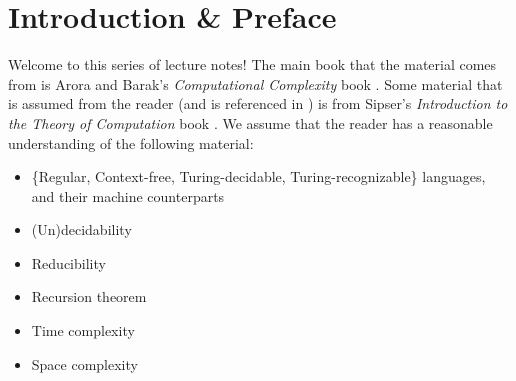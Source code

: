 \section{Introduction \& Preface}

Welcome to this series of lecture notes! The main book that the material comes from is Arora and Barak's \emph{Computational Complexity} book \cite{arora_baraz_computational_complexity}. Some material that is assumed from the reader (and is referenced in ) is from Sipser's \emph{Introduction to the Theory of Computation} book \cite{sipsertheoryofcomp}. We assume that the reader has a reasonable understanding of the following material:
\begin{itemize}
\item \{Regular, Context-free, Turing-decidable, Turing-recognizable\} languages, and their machine counterparts
\item (Un)decidability
\item Reducibility
\item Recursion theorem
\item Time complexity
\item Space complexity
\end{itemize}